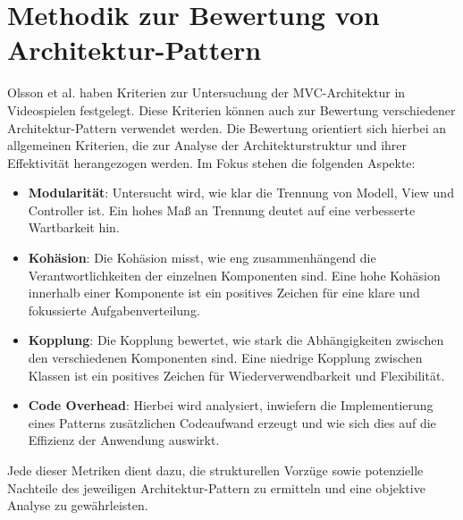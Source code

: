 
\chapter{Methodik zur Bewertung von Architektur-Pattern}
\label{chap:methodik}

Olsson et al. \cite{olsson2015evolution} haben Kriterien zur Untersuchung der \ac{MVC}-Architektur in Videospielen festgelegt. Diese Kriterien können auch zur Bewertung verschiedener Architektur-Pattern verwendet werden. Die Bewertung orientiert sich hierbei an allgemeinen Kriterien, die zur Analyse der Architekturstruktur und ihrer Effektivität herangezogen werden. Im Fokus stehen die folgenden Aspekte:

\begin{itemize}
    \item \textbf{Modularität}: Untersucht wird, wie klar die Trennung von Modell, View und Controller ist. Ein hohes Maß an Trennung deutet auf eine verbesserte Wartbarkeit hin.
    
    \item \textbf{Kohäsion}: Die Kohäsion misst, wie eng zusammenhängend die Verantwortlichkeiten der einzelnen Komponenten sind. Eine hohe Kohäsion innerhalb einer Komponente ist ein positives Zeichen für eine klare und fokussierte Aufgabenverteilung.
    
    \item \textbf{Kopplung}: Die Kopplung bewertet, wie stark die Abhängigkeiten zwischen den verschiedenen Komponenten sind. Eine niedrige Kopplung zwischen Klassen ist ein positives Zeichen für Wiederverwendbarkeit und Flexibilität.
    
    \item \textbf{Code Overhead}: Hierbei wird analysiert, inwiefern die Implementierung eines Patterns zusätzlichen Codeaufwand erzeugt und wie sich dies auf die Effizienz der Anwendung auswirkt.
\end{itemize}

Jede dieser Metriken dient dazu, die strukturellen Vorzüge sowie 
potenzielle Nachteile des jeweiligen Architektur-Pattern zu ermitteln und eine 
objektive Analyse zu gewährleisten.